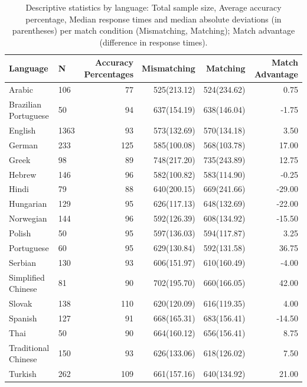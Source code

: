 \documentclass[
  man,floatsintext]{apa6}
\begin{document}
\begin{table}

\caption{\label{tab:summary-languages}Descriptive statistics by language: Total sample size, Average accuracy percentage, Median response times and median absolute deviations (in parentheses) per match condition (Mismatching, Matching); Match advantage (difference in response times).}
\centering
\begin{tabular}[t]{llrrrr}
\toprule
Language & N & Accuracy Percentages & Mismatching & Matching & Match Advantage\\
\midrule
Arabic & 106 & 77 & 525(213.12) & 524(234.62) & 0.75\\
Brazilian Portuguese & 50 & 94 & 637(154.19) & 638(146.04) & -1.75\\
English & 1363 & 93 & 573(132.69) & 570(134.18) & 3.50\\
German & 233 & 125 & 585(100.08) & 568(103.78) & 17.00\\
Greek & 98 & 89 & 748(217.20) & 735(243.89) & 12.75\\
\addlinespace
Hebrew & 146 & 96 & 582(100.82) & 583(114.90) & -0.25\\
Hindi & 79 & 88 & 640(200.15) & 669(241.66) & -29.00\\
Hungarian & 129 & 95 & 626(117.13) & 648(132.69) & -22.00\\
Norwegian & 144 & 96 & 592(126.39) & 608(134.92) & -15.50\\
Polish & 50 & 95 & 597(136.03) & 594(117.87) & 3.25\\
\addlinespace
Portuguese & 60 & 95 & 629(130.84) & 592(131.58) & 36.75\\
Serbian & 130 & 93 & 606(151.97) & 610(160.49) & -4.00\\
Simplified Chinese & 81 & 90 & 702(195.70) & 660(166.05) & 42.00\\
Slovak & 138 & 110 & 620(120.09) & 616(119.35) & 4.00\\
Spanish & 127 & 91 & 668(165.31) & 683(156.41) & -14.50\\
\addlinespace
Thai & 50 & 90 & 664(160.12) & 656(156.41) & 8.75\\
Traditional Chinese & 150 & 93 & 626(133.06) & 618(126.02) & 7.50\\
Turkish & 262 & 109 & 661(157.16) & 640(134.92) & 21.00\\
\bottomrule
\end{tabular}
\end{table}
\end{document}
